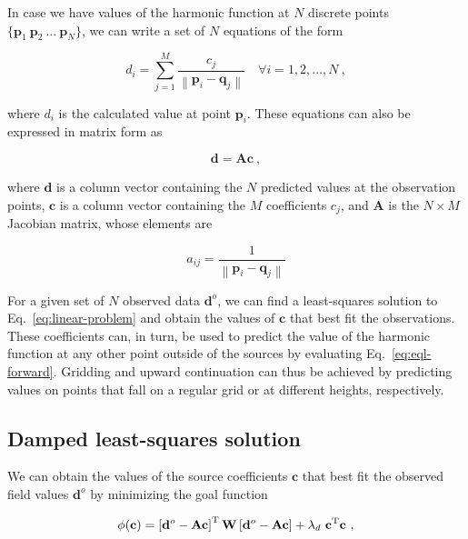 In case we have values of the harmonic function at $N$ discrete points
$\{\mathbf{p}_1\ \mathbf{p}_2\ \ldots\ \mathbf{p}_N\}$,
we can write a set of $N$ equations of the form

\begin{equation}
    d_i
    =
    \sum\limits_{j=1}^{M} \frac{c_j}{\left\lVert \mathbf{p}_i - \mathbf{q}_j
    \right\rVert}
    \quad \forall i=1,2,\ldots,N
    \ ,
    \label{eq:forward-sum}
\end{equation}

\noindent where $d_i$ is the calculated value at point $\mathbf{p}_i$.
These equations can also be expressed in matrix form as

\begin{equation}
    \mathbf{d} = \mathbf{A} \mathbf{c} \ ,
    \label{eq:linear-problem}
\end{equation}

\noindent where $\mathbf{d}$ is a column vector containing the $N$ predicted
values at the observation points,
$\mathbf{c}$ is a column vector containing the $M$ coefficients $c_j$,
and $\mathbf{A}$ is the $N \times M$ Jacobian matrix,
whose elements are

\begin{equation}
    a_{ij} = \frac{1}{\left\lVert\mathbf{p}_i - \mathbf{q}_j\right\rVert}
\end{equation}

For a given set of $N$ observed data $\mathbf{d}^o$,
we can find a least-squares solution to
Eq.~\ref{eq:linear-problem} and obtain the values of
$\mathbf{c}$ that best fit the observations.
These coefficients can, in turn, be used to predict the value of the harmonic
function at any other point outside of the sources by evaluating
Eq.~\ref{eq:eql-forward}.
Gridding and upward continuation can thus be achieved by predicting values on
points that fall on a regular grid or at different heights, respectively.


\subsection{Damped least-squares solution}
\label{sec:eql_inversion}

We can obtain the values of the source coefficients $\mathbf{c}$ that best
fit the observed field values $\mathbf{d}^o$ by minimizing the goal function

\begin{equation}
    \phi(\mathbf{c}) =
    \left[\mathbf{d}^o - \mathbf{A}\mathbf{c}\right]^{\text{T}}
    \mathbf{W}
    \left[\mathbf{d}^o - \mathbf{A}\mathbf{c}\right]
    + \lambda_d\ \mathbf{c}^{\text{T}}\mathbf{c}
    \ ,
    \label{eq:misfit-unscaled}
\end{equation}

